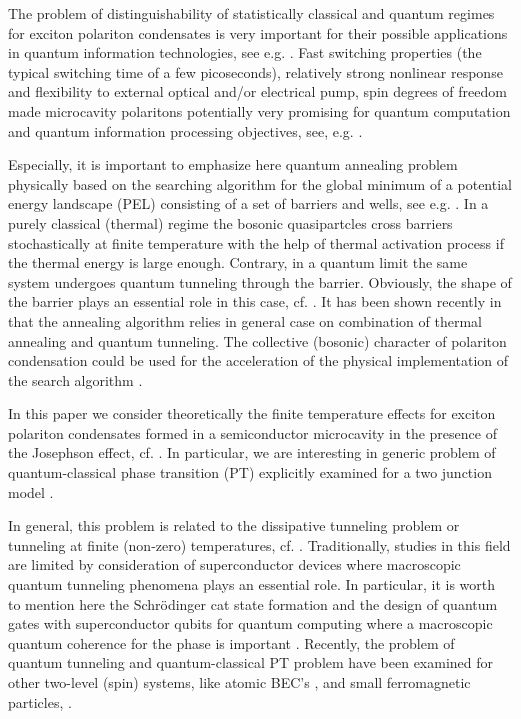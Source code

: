 \documentclass[aps, pre, preprint, groupedaddress, superscriptaddress, showkeys, showpacs] {revtex4-1}
\begin{document}
The problem of distinguishability of statistically classical and quantum regimes for exciton polariton condensates is very important for their possible applications in quantum information technologies, see e.g. \cite{Dominici}.
Fast switching properties (the typical switching time of a few picoseconds), relatively strong nonlinear response and flexibility to external optical and/or electrical pump, spin degrees of freedom made microcavity polaritons potentially very promising for quantum computation and quantum information processing objectives, see, e.g. \cite{Demirchyan,Pagel,Kyriienko,Solnyshkov_2015, Dominici}.

Especially, it is important to emphasize here quantum annealing problem physically based on the searching algorithm for the global minimum of a potential energy landscape (PEL) consisting of a set of barriers and wells, see e.g.  \cite{Santoro, Das}.
In a purely classical  (thermal) regime the {bosonic quasipartcles cross barriers stochastically} at finite temperature with the help of thermal activation process if the thermal energy is large enough. Contrary, in a quantum limit the same system undergoes quantum tunneling through the barrier. Obviously, the shape of the barrier plays an essential role in this case, cf. \cite{Das, Lewenstein}. It has been shown recently in \cite{Lewenstein} that the annealing algorithm relies in general case on combination of thermal annealing and quantum tunneling. The     
collective (bosonic) character of polariton condensation could be used for the acceleration of the physical implementation of the search algorithm \cite{Yan}.  
  
In this paper we consider theoretically the finite temperature effects for exciton polariton condensates formed in a semiconductor microcavity in the presence of the Josephson effect, cf. \cite{Aleiner, Shelykh_2008, Borgh_2010}. 
In particular, we are interesting in generic problem of quantum-classical phase transition (PT) explicitly examined for a two junction model \cite{Chudnovsky_1997}.

In general, this problem is related to the dissipative tunneling problem or tunneling at finite (non-zero) temperatures, cf. \cite{Caldeira, Larkin, Riseborough}.
Traditionally,  studies in this field are limited by consideration of superconductor devices \cite{Ankerhold} where macroscopic quantum tunneling phenomena plays an essential role.
In particular, it is worth to mention here the Schr\"odinger cat state formation \cite{Leggett} and the 	design of quantum gates with superconductor qubits for quantum computing where a macroscopic quantum coherence for the phase is important \cite{Makhlin}.
Recently, the problem of quantum tunneling and quantum-classical PT problem have been examined for other two-level (spin) systems, like atomic BEC's \cite{Zhang}, and small ferromagnetic particles, \cite{Owerre}.
  
\end{document}
